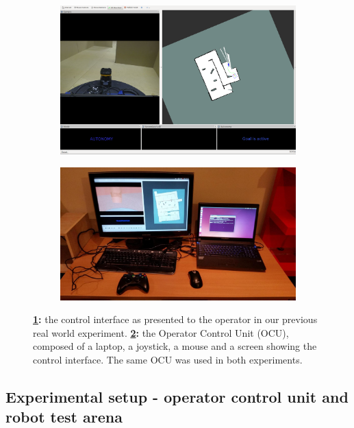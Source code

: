 \documentclass[a4paper,12pt,oneside,openright]{bhamthesis}
\begin{document}
\begin{figure}
		\centering
		\begin{subfigure}[b]{0.48\textwidth}
			\centering
			\includegraphics[width=\textwidth]{chapter4_fig/interface_real.png}
			\caption{}
			\label{subfig:interface_real_exp2}
		\end{subfigure}
		\hfill
		\begin{subfigure}[b]{0.49\textwidth}
			\centering
			\includegraphics[width=\textwidth]{chapter4_fig/OCU.jpg}
			\caption{}
			\label{subfig:OCU_exp2}
		\end{subfigure}
		\hfill
		\caption{ \textbf{\ref{subfig:interface_real_exp2}:} the control interface as presented to the operator in our previous real world experiment. \textbf{\ref{subfig:OCU_exp2}:} the Operator Control Unit (OCU), composed of a laptop, a joystick, a mouse and a screen showing the control interface. The same OCU was used in both experiments.}
		\label{fig:various_real_exp2}
	\end{figure}

\subsection{Experimental setup - operator control unit and robot test arena}
	
\end{document}
